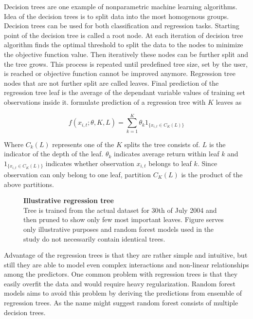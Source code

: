 \documentclass[12pt]{article}
\begin{document}
Decision trees are one example of nonparametric machine learning algorithms. Idea of the decision trees is to split data into the most homogenous groups. Decision trees can be used for both classification and regression tasks. Starting point of the decision tree is called a root node. At each iteration of decision tree algorithm finds the optimal threshold to split the data to the nodes to minimize the objective function value. Then iteratively these nodes can be further split and the tree grows. This process is repeated until predefined tree size, set by the user, is reached or objective function cannot be improved anymore. Regression tree nodes that are not further split are called leaves. Final prediction of the regression tree leaf is the average of the dependant variable values of training set observations inside it. \citet{guetal} formulate prediction of a regression tree with $K$ leaves as \par

\begin{equation}
f(x_{i, t}; \theta, K, L) = \sum_{k=1}^K \theta_k 1 _{\{x_{i, t} \in C_K(L)\}}
\end{equation}

Where $C_k(L)$ represents one of the $K$ splits the tree consists of. $L$ is the indicator of the depth of the leaf. $\theta_k$ indicates average return within leaf $k$ and $1 _{\{x_{i, t} \in C_K(L)\}}$ indicates whether observation $x_{i, t}$ belongs to leaf $k$. Since observation can only belong to one leaf, partition $C_K(L)$ is the product of the above partitions. \par

\begin{figure}[ht]
\centering
\caption[Illustrative regression tree]{\textbf{Illustrative regression tree}\\ Tree is trained from the actual dataset for 30th of July 2004 and then pruned to show only few most important leaves. Figure serves only illustrative purposes and random forest models used in the study do not necessarily contain identical trees. }

\label{plot:regre_tree}
\end{figure}

Advantage of the regression trees is that they are rather simple and intuitive, but still they are able to model even complex interactions and non-linear relationships among the predictors. One common problem with regression trees is that they easily overfit the data and would require heavy regularization. Random forest models aims to avoid this problem by deriving the predictions from ensemble of regression trees. As the name might suggest random forest consists of multiple decision trees. \par
\end{document}
